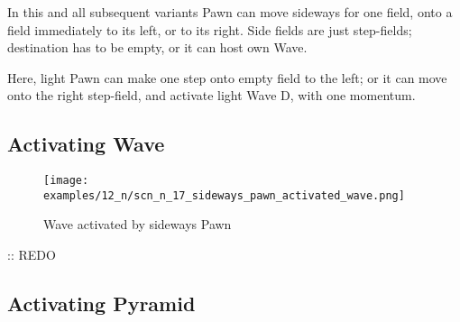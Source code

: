 \vspace*{-0.5\baselineskip}
In this and all subsequent variants Pawn can move sideways for one field, onto a field
immediately to its left, or to its right. Side fields are just step-fields; destination
has to be empty, or it can host own Wave.

Here, light Pawn can make one step onto empty field to the left; or it can move onto
the right step-field, and activate light Wave D, with one momentum.

\clearpage %

\subsection*{Activating Wave}
\label{sec:Nineteen/Sideways Pawns/Activating Wave}

\vspace*{-1.4\baselineskip}
\noindent
\begin{figure}[!h]
\texttt{[image: examples/12\_n/scn\_n\_17\_sideways\_pawn\_activated\_wave.png]}
\vspace*{-1.4\baselineskip}
\caption{Wave activated by sideways Pawn}
\label{fig:scn_n_17_sideways_pawn_activated_wave}
\end{figure}

\vspace*{-0.5\baselineskip}

\TODO :: REDO


\clearpage %

\subsection*{Activating Pyramid}
\label{sec:Nineteen/Sideways Pawns/Activating Pyramid}

